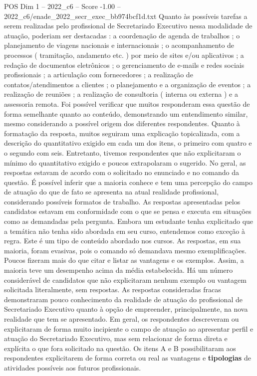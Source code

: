 \begin{textsample}{POS Dim 1 – 2022\_c6 – Score -1.00 – 2022\_c6/enade\_2022\_secr\_exec\_bb974bcf1d.txt}
Quanto às possíveis tarefas a serem realizadas pelo profissional de Secretariado Executivo nessa modalidade de atuação, poderiam ser destacadas : a coordenação de agenda de trabalhos ; o planejamento de viagens nacionais e internacionais ; o acompanhamento de processos ( tramitação, andamento etc. ) por meio de sites e/ou aplicativos ; a redação de documentos eletrônicos ; o gerenciamento de e-mails e redes sociais profissionais ; a articulação com fornecedores ; a realização de contatos/atendimentos a clientes ; o planejamento e a organização de eventos ; a realização de reuniões ; a realização de consultoria ( interna ou externa ) e a assessoria remota.
Foi possível verificar que muitos responderam essa questão de forma semelhante quanto ao conteúdo, demonstrando um entendimento similar, mesmo considerando a possível origem dos diferentes respondentes.
Quanto à formatação da resposta, muitos seguiram uma explicação topicalizada, com a descrição do quantitativo exigido em cada um dos itens, o primeiro com quatro e o segundo com seis.
Entretanto, tivemos respondentes que não explicitaram o mínimo do quantitativo exigido e poucos extrapolaram o sugerido.
No geral, as respostas estavam de acordo com o solicitado no enunciado e no comando da questão.
É possível inferir que a maioria conhece e tem uma percepção do campo de atuação do que de fato se apresenta na atual realidade profissional, considerando possíveis formatos de trabalho.
As respostas apresentadas pelos candidatos estavam em conformidade com o que se pensa e executa em situações como as demandadas pela pergunta.
Embora um estudante tenha explicitado que a temática não tenha sido abordada em seu curso, entendemos como exceção à regra.
Este é um tipo de conteúdo abordado nos cursos.
As respostas, em sua maioria, foram evasivas, pois o comando só demandava mesmo exemplificações.
Poucos fizeram mais do que citar e listar as vantagens e os exemplos.
Assim, a maioria teve um desempenho acima da média estabelecida.
Há um número considerável de candidatos que não explicitaram nenhum exemplo ou vantagem solicitada literalmente, sem respostas.
As respostas consideradas fracas demonstraram pouco conhecimento da realidade de atuação do profissional de Secretariado Executivo quanto à opção de empreender, principalmente, na nova realidade que tem se apresentado.
Em geral, os respondentes descreveram ou explicitaram de forma muito incipiente o campo de atuação ao apresentar perfil e atuação do Secretariado Executivo, mas sem relacionar de forma direta e explícita o que fora solicitado na questão.
Os itens A e B possibilitaram aos respondentes explicitarem de forma correta ou real as vantagens e \textbf{tipologias} de atividades possíveis aos futuros profissionais.

\end{textsample}
